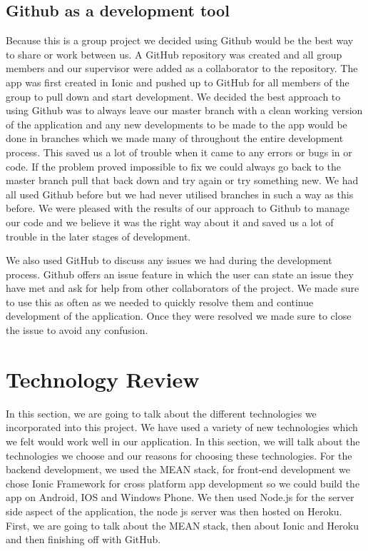 \section{Github as a development tool}
Because this is a group project we decided using Github would be the best way to share or work between us. A GitHub repository was created and all group members and our supervisor were added as a collaborator to the repository. The app was first created in Ionic and pushed up to GitHub for all members of the group to pull down and start development. We decided the best approach to using Github was to always leave our master branch with a clean working version of the application and any new developments to be made to the app would be done in branches which we made many of throughout the entire development process. This saved us a lot of trouble when it came to any errors or bugs in or code. If the problem proved impossible to fix we could always go back to the master branch pull that back down and try again or try something new. We had all used Github before but we had never utilised branches in such a way as this before. We were pleased with the results of our approach to Github to manage our code and we believe it was the right way about it and saved us a lot of trouble in the later stages of development.

We also used GitHub to discuss any issues we had during the development process. Github offers an issue feature in which the user can state an issue they have met and ask for help from other collaborators of the project. We made sure to use this as often as we needed to quickly resolve them and continue development of the application. Once they were resolved we made sure to close the issue to avoid any confusion. 



\chapter{Technology Review}
In this section, we are going to talk about the different technologies we incorporated into this project.
We have used a variety of new technologies which we felt would work well in our application. In this section, we will talk about the technologies we choose and our reasons for choosing these technologies. 
For the backend development, we used the MEAN stack, for front-end development we chose Ionic Framework for cross platform app development so we could build the app on Android, IOS and Windows Phone. We then used Node.js for the server side aspect of the application, the node js server was then hosted on Heroku. First, we are going to talk about the MEAN stack, then about Ionic and Heroku and then finishing off with GitHub. 

